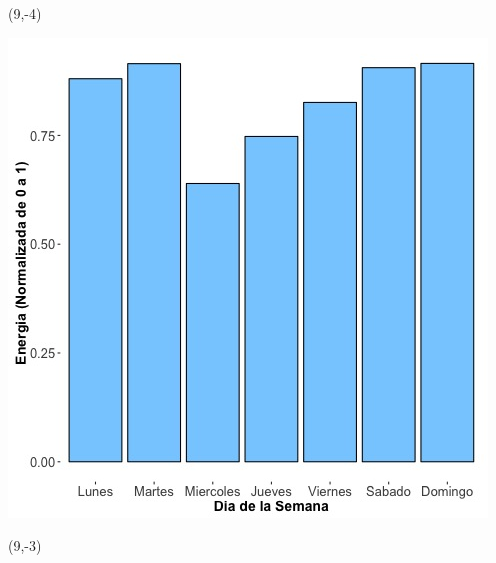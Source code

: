 \documentclass{article}\usepackage[]{graphicx}\usepackage[]{color}
\newenvironment{knitrout}{}{} %
\begin{document}
 \begin{textblock}{1}(9,-4)
\begin{minipage}{20em}
\begingroup

\endgroup
\end{minipage}
\end{textblock}


\begin{knitrout}
\color{fgcolor}
\includegraphics[scale=0.65]{figure/A14_day_of_week_plot} 
\end{knitrout}


 \begin{textblock}{1}(9,-3)
\begin{minipage}{20em}
\begingroup

\endgroup
\end{minipage}
\end{textblock}

 \vspace{2cm}
\end{document}
